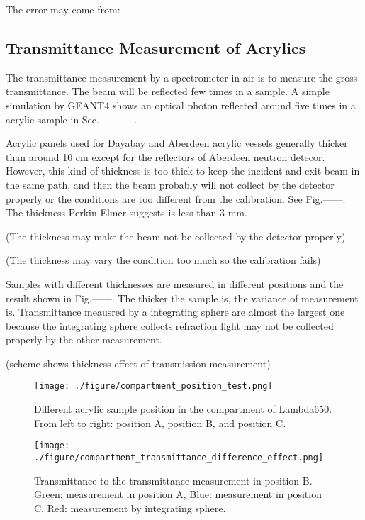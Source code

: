 The error may come from:

\subsection{Transmittance Measurement of Acrylics}

The transmittance measurement by a spectrometer in air is to measure the gross transmittance.
The beam will be reflected few times in a sample. A simple simulation by GEANT4 shows
an optical photon reflected around five times in a acrylic sample in Sec.-----------.

Acrylic panels used for Dayabay and Aberdeen acrylic vessels
generally thicker than around 10 cm except for the reflectors of Aberdeen
neutron detecor. However, this kind of thickness is too thick to
keep the incident and exit beam in the same path, and then
the beam probably will not collect by the detector properly or
the conditions are too different from the calibration. See Fig.------.
The thickness Perkin Elmer suggests is less than 3 mm.


(The thickness may make the beam not be collected by the detector properly)


(The thickness may vary the condition too much so the calibration fails)


Samples with different thicknesses are measured in different positions and
the result shown in Fig.------. The thicker the sample is, the variance of
measurement is. Transmittance meausred by a integrating sphere
are almost the largest one because the integrating sphere collects refraction light may
not be collected properly by the other measurement.

(scheme shows thickness effect of transmission measurement)
\begin{figure}
    \centering
    \texttt{[image: ./figure/compartment\_position\_test.png]}
    \caption{Different acrylic sample position in the compartment of Lambda650. From
 left to right: position A, position B, and position C.}
    \label{compartment_position_test.png}
    \end{figure}


\begin{figure}
    \centering
    \texttt{[image: ./figure/compartment\_transmittance\_difference\_effect.png]}
    \caption{Transmittance to the transmittance measurement in position B. Green: measurement in position A, Blue:
 measurement in position C. Red: measurement by integrating sphere.}
    \label{compartment_transmittance_difference_effect.png}
    \end{figure}


